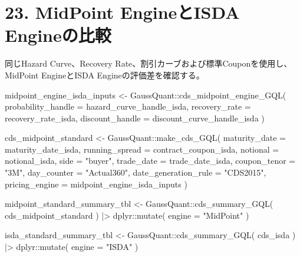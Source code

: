 \documentclass[
  letterpaper,
  DIV=11,
  numbers=noendperiod]{scrreprt}
\newenvironment{Shaded}{\begin{snugshade}}{\end{snugshade}}
\newcommand{\AttributeTok}[1]{\textcolor[rgb]{0.40,0.45,0.13}{#1}}
\newcommand{\FunctionTok}[1]{\textcolor[rgb]{0.28,0.35,0.67}{#1}}
\newcommand{\NormalTok}[1]{\textcolor[rgb]{0.00,0.23,0.31}{#1}}
\newcommand{\OtherTok}[1]{\textcolor[rgb]{0.00,0.23,0.31}{#1}}
\newcommand{\SpecialCharTok}[1]{\textcolor[rgb]{0.37,0.37,0.37}{#1}}
\newcommand{\StringTok}[1]{\textcolor[rgb]{0.13,0.47,0.30}{#1}}
\begin{document}
\section{23. MidPoint EngineとISDA
Engineの比較}\label{midpoint-engineux3068isda-engineux306eux6bd4ux8f03}

同じHazard Curve、Recovery
Rate、割引カーブおよび標準Couponを使用し、MidPoint EngineとISDA
Engineの評価差を確認する。

\begin{Shaded}
\begin{Highlighting}[]
\NormalTok{midpoint\_engine\_isda\_inputs }\OtherTok{\textless{}{-}}\NormalTok{ GaussQuant}\SpecialCharTok{::}\FunctionTok{cds\_midpoint\_engine\_GQL}\NormalTok{(}
  \AttributeTok{probability\_handle =}\NormalTok{ hazard\_curve\_handle\_isda,}
  \AttributeTok{recovery\_rate =}\NormalTok{ recovery\_rate\_isda,}
  \AttributeTok{discount\_handle =}\NormalTok{ discount\_curve\_handle\_isda}
\NormalTok{)}

\NormalTok{cds\_midpoint\_standard }\OtherTok{\textless{}{-}}\NormalTok{ GaussQuant}\SpecialCharTok{::}\FunctionTok{make\_cds\_GQL}\NormalTok{(}
  \AttributeTok{maturity\_date =}\NormalTok{ maturity\_date\_isda,}
  \AttributeTok{running\_spread =}\NormalTok{ contract\_coupon\_isda,}
  \AttributeTok{notional =}\NormalTok{ notional\_isda,}
  \AttributeTok{side =} \StringTok{"buyer"}\NormalTok{,}
  \AttributeTok{trade\_date =}\NormalTok{ trade\_date\_isda,}
  \AttributeTok{coupon\_tenor =} \StringTok{"3M"}\NormalTok{,}
  \AttributeTok{day\_counter =} \StringTok{"Actual360"}\NormalTok{,}
  \AttributeTok{date\_generation\_rule =} \StringTok{"CDS2015"}\NormalTok{,}
  \AttributeTok{pricing\_engine =}\NormalTok{ midpoint\_engine\_isda\_inputs}
\NormalTok{)}

\NormalTok{midpoint\_standard\_summary\_tbl }\OtherTok{\textless{}{-}}\NormalTok{ GaussQuant}\SpecialCharTok{::}\FunctionTok{cds\_summary\_GQL}\NormalTok{(}
\NormalTok{  cds\_midpoint\_standard}
\NormalTok{) }\SpecialCharTok{|\textgreater{}}
\NormalTok{  dplyr}\SpecialCharTok{::}\FunctionTok{mutate}\NormalTok{(}
    \AttributeTok{engine =} \StringTok{"MidPoint"}
\NormalTok{  )}

\NormalTok{isda\_standard\_summary\_tbl }\OtherTok{\textless{}{-}}\NormalTok{ GaussQuant}\SpecialCharTok{::}\FunctionTok{cds\_summary\_GQL}\NormalTok{(}
\NormalTok{  cds\_isda}
\NormalTok{) }\SpecialCharTok{|\textgreater{}}
\NormalTok{  dplyr}\SpecialCharTok{::}\FunctionTok{mutate}\NormalTok{(}
    \AttributeTok{engine =} \StringTok{"ISDA"}
\NormalTok{  )}


\end{Highlighting}
\end{Shaded}
\end{document}
